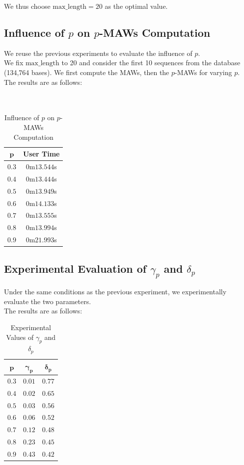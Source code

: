 \documentclass[conference]{IEEEtran}
\begin{document}
We thus choose $\text{max\_length} = 20$ as the optimal value.

\subsection{Influence of $p$ on $p$-MAWs Computation}
We reuse the previous experiments to evaluate the influence of $p$.\\
We fix $\text{max\_length}$ to 20 and consider the first 10 sequences from the database (134,764 bases). We first compute the MAWs, then the $p$-MAWs for varying $p$.\\
The results are as follows:\\
\\
\\


\begin{table}[htbp]
\caption{Influence of $p$ on $p$-MAWs Computation}
\begin{center}
\begin{tabular}{|c|c|}
\hline
$\mathbf{p}$ & \textbf{User Time} \\
\hline
$0.3$ & $0$m$13.544$s\\
\hline
$0.4$ & $0$m$13.444$s\\
\hline
$0.5$ & $0$m$13.949$s\\
\hline
$0.6$ & $0$m$14.133$s\\
\hline
$0.7$ & $0$m$13.555$s\\
\hline
$0.8$ & $0$m$13.994$s\\
\hline
$0.9$ & $0$m$21.993$s\\
\hline
\end{tabular}
\end{center}
\end{table}

\subsection{Experimental Evaluation of $\gamma_p$ and $\delta_p$}
Under the same conditions as the previous experiment, we experimentally evaluate the two parameters.\\
The results are as follows:

\begin{table}[htbp]
\caption{Experimental Values of $\gamma_p$ and $\delta_p$}
\begin{center}
\begin{tabular}{|c|c|c|}
\hline
$\mathbf{p}$ & $\mathbf{\gamma_p}$ & $\mathbf{\delta_p}$ \\
\hline
$0.3$ & $0.01$ & $0.77$ \\
\hline
$0.4$ & $0.02$ & $0.65$ \\
\hline
$0.5$ & $0.03$ & $0.56$ \\
\hline
$0.6$ & $0.06$ & $0.52$ \\
\hline
$0.7$ & $0.12$ & $0.48$ \\
\hline
$0.8$ & $0.23$ & $0.45$ \\
\hline
$0.9$ & $0.43$ & $0.42$ \\
\hline
\end{tabular}
\end{center}
\end{table}
\end{document}
